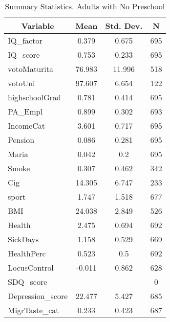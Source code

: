 
\begin{table}[htbp]\centering \caption{Summary Statistics. Adults with No Preschool \label{schoolAdultmaternaNone}}
\begin{tabular}{l c c  c}\hline\hline
\multicolumn{1}{c}{\textbf{Variable}} & \textbf{Mean}
 & \textbf{Std. Dev.} & \textbf{N}\\ \hline
IQ\_factor & 0.379 & 0.675  & 695\\
IQ\_score & 0.753 & 0.233  & 695\\
votoMaturita & 76.983 & 11.996  & 518\\
votoUni & 97.607 & 6.654  & 122\\
highschoolGrad & 0.781 & 0.414  & 695\\
PA\_Empl & 0.899 & 0.302  & 693\\
IncomeCat & 3.601 & 0.717  & 695\\
Pension & 0.086 & 0.281  & 695\\
Maria & 0.042 & 0.2  & 695\\
Smoke & 0.307 & 0.462  & 342\\
Cig & 14.305 & 6.747  & 233\\
sport & 1.747 & 1.518  & 677\\
BMI & 24.038 & 2.849  & 526\\
Health & 2.475 & 0.694  & 692\\
SickDays & 1.158 & 0.529  & 669\\
HealthPerc & 0.523 & 0.5  & 692\\
LocusControl & -0.011 & 0.862  & 628\\
SDQ\_score &  &   & 0\\
Depression\_score & 22.477 & 5.427  & 685\\
MigrTaste\_cat & 0.233 & 0.423  & 687\\
\hline\end{tabular}
\end{table}
